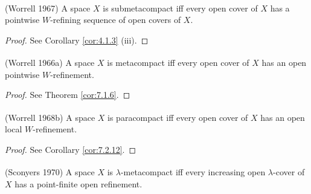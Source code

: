 \documentclass[main.tex]{subfiles}
\begin{document}
{\theorem{} \label{th:3.1.7} \textup{(\hstretch{1.8}{[}Worrell 1967\hstretch{1.8}{]}\textsuperscript{\cite{Worrell1967}})} 
A space $X$ is submetacompact iff every open cover of $X$ has a pointwise $W$-refining sequence of open covers of $X$.
}

\begin{proof}
 See Corollary \ref{cor:4.1.3} (iii). 
\end{proof}


{\theorem{} \label{th:3.1.8} 
\textup{(\hstretch{1.8}{[}Worrell 1966a\hstretch{1.8}{]}\textsuperscript{\cite{Worrell1966}})}
A space $X$ is metacompact iff every open cover of $X$ has an open pointwise $W$-refinement.
}

\begin{proof}
	 See Theorem \ref{cor:7.1.6}.  %
\end{proof}


{\theorem{} \label{th:3.1.9}
\textup{(\hstretch{1.8}{[}Worrell 1968b\hstretch{1.8}{]}\textsuperscript{\cite{Worrell1968}})} 
A space $X$ is paracompact iff every open cover of $X$ has an open local $W$-refinement.
}

\begin{proof}
See Corollary \ref{cor:7.2.12}. 
\end{proof}


{\theorem{} \label{th:3.1.10} 
\textup{(\hstretch{1.8}{[}Sconyers 1970\hstretch{1.8}{]}\textsuperscript{\cite{Sconyers}})} 
A space $X$ is $\lambda$-metacompact iff every increasing open $\lambda$-cover of $X$ has a point-finite open refinement.
}
\end{document}
